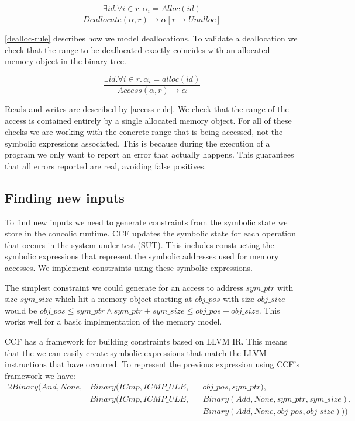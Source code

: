 \documentclass[12pt,twoside]{report}
\begin{document}
\begin{equation}\label{dealloc-rule}
\frac{\exists id. \forall i \in r. \, \alpha_i = Alloc(id)}{Deallocate(\alpha, r) \rightarrow \alpha[r \rightarrow Unalloc]}
\end{equation}

\eqref{dealloc-rule} describes how we model deallocations. To validate a deallocation we check that the range to be deallocated exactly coincides with an allocated memory object in the binary tree.

\begin{equation}\label{access-rule}
    \frac{\exists id. \forall i \in r. \, \alpha_i = alloc(id)}{Access(\alpha, r) \rightarrow \alpha}
\end{equation}

Reads and writes are described by \eqref{access-rule}. We check that the range of the access is contained entirely by a single allocated memory object. For all of these checks we are working with the concrete range that is being accessed, not the symbolic expressions associated. This is because during the execution of a program we only want to report an error that actually happens. This guarantees that all errors reported are real, avoiding false positives.

\subsection{Finding new inputs}
To find new inputs we need to generate constraints from the symbolic state we store in the concolic runtime. CCF updates the symbolic state for each operation that occurs in the system under test (SUT). This includes constructing the symbolic expressions that represent the symbolic addresses used for memory accesses. We implement constraints using these symbolic expressions.

The simplest constraint we could generate for an access to address $sym\_ptr$ with size $sym\_size$ which hit a memory object starting at $obj\_pos$ with size $obj\_size$ would be $obj\_pos \leq sym\_ptr \wedge sym\_ptr + sym\_size\leq obj\_pos + obj\_size$. This works well for a basic implementation of the memory model.

CCF has a framework for building constraints based on LLVM IR. This means that the we can easily create symbolic expressions that match the LLVM instructions that have occurred. To represent the previous expression using CCF's framework we have:
\begin{alignat*}{2}
Binary(And, None, &Binary(ICmp, \textit{ICMP\_ULE}, &&obj\_pos, sym\_ptr),\\
&Binary(ICmp, \textit{ICMP\_ULE}, &&Binary(Add, None, sym\_ptr, sym\_size), \\
& &&Binary(Add, None, obj\_pos, obj\_size)))
\end{alignat*}
\end{document}

